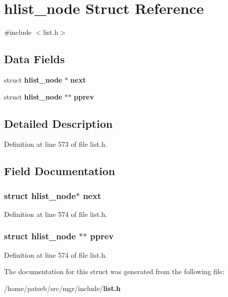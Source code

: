 \section{hlist\-\_\-node Struct Reference}
\label{structhlist__node}


{\ttfamily \#include $<$list.\-h$>$}

\subsection*{Data Fields}
\begin{DoxyCompactItemize}
\item 
struct {\bf hlist\-\_\-node} $\ast$ {\bf next}
\item 
struct {\bf hlist\-\_\-node} $\ast$$\ast$ {\bf pprev}
\end{DoxyCompactItemize}


\subsection{Detailed Description}


Definition at line 573 of file list.\-h.



\subsection{Field Documentation}
\subsubsection[{next}]{\setlength{\rightskip}{0pt plus 5cm}struct {\bf hlist\-\_\-node}$\ast$ {\bf next}}\label{structhlist__node_a6b661073d520a19a20064b6584e5794a}


Definition at line 574 of file list.\-h.

\subsubsection[{pprev}]{\setlength{\rightskip}{0pt plus 5cm}struct {\bf hlist\-\_\-node} $\ast$$\ast$ {\bf pprev}}\label{structhlist__node_a833f6279453aa2ca907756cd7d36b1fa}


Definition at line 574 of file list.\-h.



The documentation for this struct was generated from the following file\-:\begin{DoxyCompactItemize}
\item 
/home/patseb/src/mgr/include/{\bf list.\-h}\end{DoxyCompactItemize}
